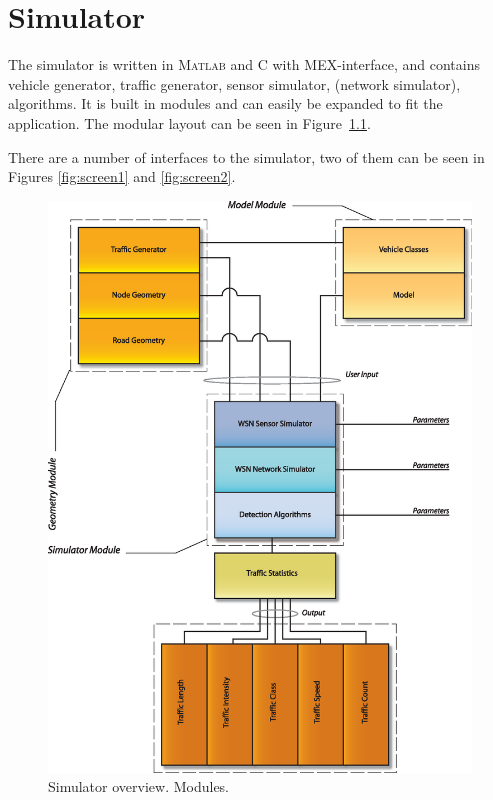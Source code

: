 \cleardoublepage\chapter{Simulator}\label{chap:simulator}
The simulator is written in \textsc{Matlab} and C with MEX-interface, and contains vehicle generator, traffic generator, sensor simulator, (network simulator), algorithms. It is built in modules and can easily be expanded to fit the application. The modular layout can be seen in Figure~\ref{fig:software}.

There are a number of interfaces to the simulator, two of them can be seen in Figures \ref{fig:screen1} and \ref{fig:screen2}.

\begin{figure}[!f]
\centering
  \begin{minipage}{1\linewidth}
  \centering
   \includegraphics[width=1\linewidth]{images/software}
  \caption[Simulator overview]{Simulator overview. Modules.}
  \label{fig:software}
  \end{minipage}
\end{figure}


